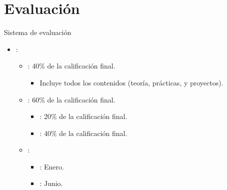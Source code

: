 \section{Evaluación}

\begin{frame}[t]{Sistema de evaluación}
\begin{itemize}
  \item {}:

  \begin{itemize}
    \item {}: 40\% de la calificación final.
      \begin{itemize}
        \item Incluye todos los contenidos (teoría, prácticas, y proyectos).
      \end{itemize}

    \item {}: 60\% de la calificación final.
      \begin{itemize}
        \item {}: 20\% de la calificación final.
        \item {}: 40\% de la calificación final.
      \end{itemize}
  \end{itemize}

  \begin{itemize}
    \item {}:
      \begin{itemize}
        \item {}: Enero.
        \item {}: Junio.
      \end{itemize}
  \end{itemize}
\end{itemize}
\end{frame}

